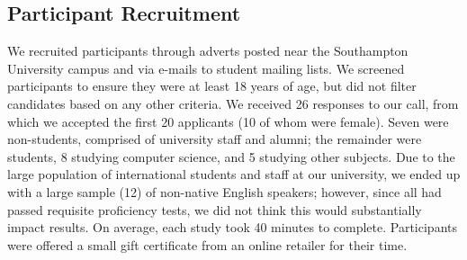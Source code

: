 \documentclass{sigchi}
\begin{document}

\subsection{Participant Recruitment}

We recruited participants through adverts posted near the Southampton University campus and via e-mails to student mailing lists.  We screened participants to ensure they were at least 18 years of age, but did not filter candidates based on any other criteria.  We received 26 responses to our call, from which we accepted the first 20 applicants (10 of whom were female). Seven were non-students, comprised of university staff and alumni; the remainder were students, 8 studying computer science, and 5 studying other subjects.  Due to the large population of international students and staff at our university, we ended up with a large sample (12) of non-native English speakers; however, since all had passed requisite proficiency tests, we did not think this would substantially impact results.  On average, each study took 40 minutes to complete.  Participants were offered a small gift certificate from an online retailer for their time. 



\end{document}
